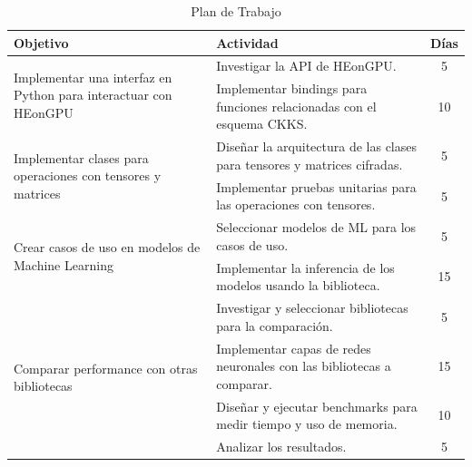 \begin{table}[h]
    \centering
    \begin{tabular}{|p{5.5cm}|p{7cm}|c|}
        \hline
        \textbf{Objetivo} & \textbf{Actividad} & \textbf{Días} \\
        \hline
        \multirow{2}{=}{Implementar una interfaz en Python para interactuar con HEonGPU}
            & Investigar la API de HEonGPU. & 5 \\
        \cline{2-3}
            & Implementar bindings para funciones relacionadas con el esquema CKKS. & 10 \\
        \hline
        \multirow{2}{=}{Implementar clases para operaciones con tensores y matrices}
            & Diseñar la arquitectura de las clases para tensores y matrices cifradas. & 5 \\
        \cline{2-3}
            & Implementar pruebas unitarias para las operaciones con tensores. & 5 \\
        \hline
        \multirow{2}{=}{Crear casos de uso en modelos de Machine Learning}
            & Seleccionar modelos de ML para los casos de uso. & 5 \\
        \cline{2-3}
            & Implementar la inferencia de los modelos usando la biblioteca. & 15 \\
        \hline
        \multirow{4}{=}{Comparar performance con otras bibliotecas}
            & Investigar y seleccionar bibliotecas para la comparación. & 5 \\
        \cline{2-3}
            & Implementar capas de redes neuronales con las bibliotecas a comparar. & 15 \\
        \cline{2-3}
            & Diseñar y ejecutar benchmarks para medir tiempo y uso de memoria. & 10 \\
        \cline{2-3}
            & Analizar los resultados. & 5 \\
        \hline
    \end{tabular}
    \caption{Plan de Trabajo}
    \label{tab:plan_trabajo}
\end{table}
